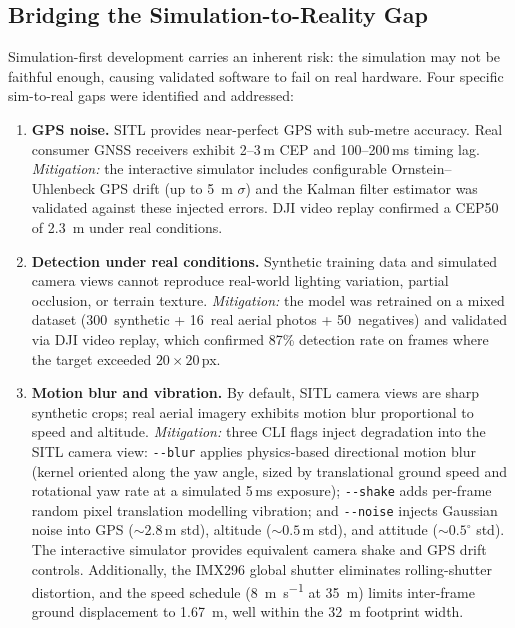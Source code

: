 \subsection{Bridging the Simulation-to-Reality Gap}\label{sec:sim-real-gap-strategy}

Simulation-first development carries an inherent risk: the simulation may not be faithful enough, causing validated software to fail on real hardware.
Four specific sim-to-real gaps were identified and addressed:

\begin{enumerate}
  \item \textbf{GPS noise.}
    SITL provides near-perfect GPS with sub-metre accuracy.
    Real consumer GNSS receivers exhibit 2--3\,m CEP and 100--200\,ms timing lag.
    \emph{Mitigation:} the interactive simulator includes configurable Ornstein--Uhlenbeck GPS drift (up to \SI{5}{\metre} $\sigma$) and the Kalman filter estimator was validated against these injected errors. DJI video replay confirmed a CEP50 of \SI{2.3}{\metre} under real conditions.

  \item \textbf{Detection under real conditions.}
    Synthetic training data and simulated camera views cannot reproduce real-world lighting variation, partial occlusion, or terrain texture.
    \emph{Mitigation:} the model was retrained on a mixed dataset (300~synthetic + 16~real aerial photos + 50~negatives) and validated via DJI video replay, which confirmed 87\% detection rate on frames where the target exceeded $20 \times 20$\,px.

  \item \textbf{Motion blur and vibration.}
    By default, SITL camera views are sharp synthetic crops; real aerial imagery exhibits motion blur proportional to speed and altitude.
    \emph{Mitigation:} three CLI flags inject degradation into the SITL camera view: \texttt{-{}-blur} applies physics-based directional motion blur (kernel oriented along the yaw angle, sized by translational ground speed and rotational yaw rate at a simulated 5\,ms exposure); \texttt{-{}-shake} adds per-frame random pixel translation modelling vibration; and \texttt{-{}-noise} injects Gaussian noise into GPS (${\sim}2.8$\,m std), altitude (${\sim}0.5$\,m std), and attitude (${\sim}0.5^{\circ}$ std). The interactive simulator provides equivalent camera shake and GPS drift controls. Additionally, the IMX296 global shutter eliminates rolling-shutter distortion, and the speed schedule (\SI{8}{\metre\per\second} at \SI{35}{\metre}) limits inter-frame ground displacement to \SI{1.67}{\metre}, well within the \SI{32}{\metre} footprint width.


\end{enumerate}
